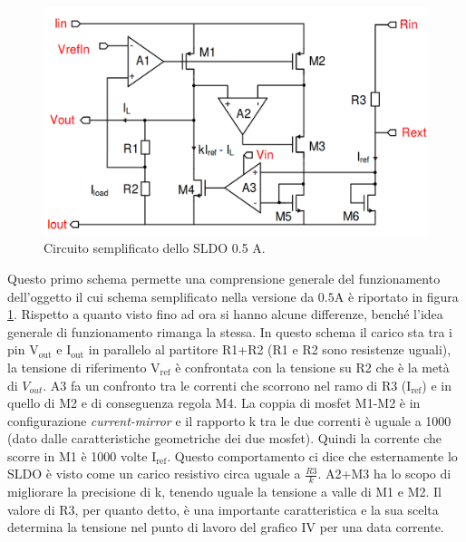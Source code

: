 \begin{figure}
\centering
\includegraphics[scale=.3]{Immagini/SLDO5A}
\caption{Circuito semplificato dello SLDO 0.5 A.}
\label{SLDO5A}
\end{figure}

Questo primo schema permette una comprensione generale del funzionamento dell'oggetto il cui schema semplificato nella versione da $\mathrm{0.5 A}$ è riportato in figura \ref{SLDO5A}. Rispetto a quanto visto fino ad ora si hanno alcune differenze, benché l'idea generale di funzionamento rimanga la stessa. 
In questo schema il carico sta tra i pin $\mathrm{V_{out}}$ e $\mathrm{I_{out}}$ in parallelo al partitore R1+R2 (R1 e R2 sono resistenze uguali), la tensione di riferimento $\mathrm{V_{ref}}$ è confrontata con la tensione su R2 che è la metà di $V_{out}$. A3 fa un confronto tra le correnti che scorrono nel ramo di R3 ($\mathrm{I_{ref}}$) e in quello di M2 e di conseguenza regola M4. La coppia di mosfet M1-M2 è in configurazione \textit{current-mirror} e il rapporto k tra le due correnti è uguale a 1000 (dato dalle caratteristiche geometriche dei due mosfet). 
Quindi la corrente che scorre in M1 è 1000 volte $\mathrm{I_{ref}}$. Questo comportamento ci dice che esternamente lo SLDO è visto come un carico resistivo circa uguale a $\frac{R3}{k}$. A2+M3 ha lo scopo di migliorare la precisione di k, tenendo uguale la tensione a valle di M1 e M2. Il valore di R3, per quanto detto, è una importante caratteristica e la sua scelta determina la tensione nel punto di lavoro del grafico IV per una data corrente. 

